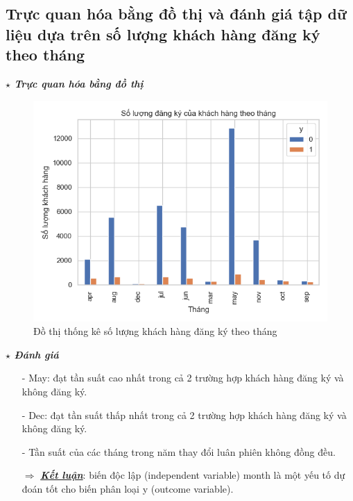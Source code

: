 \documentclass{report}
\begin{document}
        \pagebreak
        
        \subsection{Trực quan hóa bằng đồ thị và đánh giá tập dữ liệu dựa trên số lượng khách hàng đăng ký theo tháng}
            \fontsize{13}{10}\selectfont \textbf{$\star$\textit{ Trực quan hóa bằng đồ thị}}
                \begin{figure}[htp]
                    \centering
                    \includegraphics[scale = 0.8]{image/frequency_month.png}
                    \caption{Đồ thị thống kê  số lượng khách hàng đăng ký theo tháng}
                \end{figure}
            
            \fontsize{13}{10}\selectfont \textbf{$\star$\textit{ Đánh giá}}
                \begin{enumerate}
                    \item [- ] May: đạt tần suất cao nhất trong cả 2 trường hợp khách hàng đăng ký và không đăng ký.
                    \item [- ] Dec: đạt tần suất thấp nhất trong cả 2 trường hợp khách hàng đăng ký và không đăng ký.
                    \item [- ] Tần suất của các tháng trong năm thay đổi luân phiên không đồng đều.
                    \item [$\Rightarrow$] \textbf{\underline{\textit{Kết luận}}}: biến độc lập (independent variable) month là một yếu tố dự đoán tốt cho biến phân loại y (outcome variable).
                \end{enumerate}
            
\end{document}
